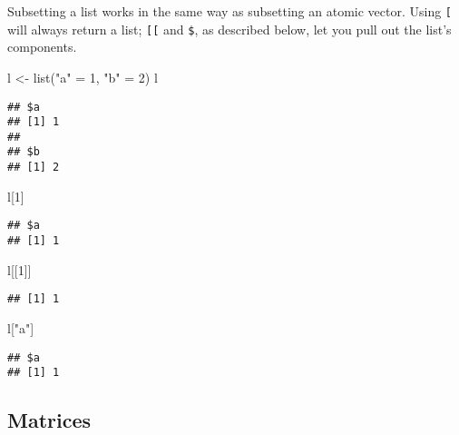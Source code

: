 \documentclass[
]{book}
\newenvironment{Shaded}{\begin{snugshade}}{\end{snugshade}}
\newcommand{\DecValTok}[1]{\textcolor[rgb]{0.00,0.00,0.81}{#1}}
\newcommand{\FunctionTok}[1]{\textcolor[rgb]{0.00,0.00,0.00}{#1}}
\newcommand{\NormalTok}[1]{#1}
\newcommand{\OtherTok}[1]{\textcolor[rgb]{0.56,0.35,0.01}{#1}}
\newcommand{\StringTok}[1]{\textcolor[rgb]{0.31,0.60,0.02}{#1}}
\begin{document}
Subsetting a list works in the same way as subsetting an atomic vector. Using \texttt{{[}} will always return a list; \texttt{{[}{[}} and \texttt{\$}, as described below, let you pull out the list's components.

\begin{Shaded}
\begin{Highlighting}[]
\NormalTok{l }\OtherTok{\textless{}{-}} \FunctionTok{list}\NormalTok{(}\StringTok{"a"} \OtherTok{=} \DecValTok{1}\NormalTok{, }\StringTok{"b"} \OtherTok{=} \DecValTok{2}\NormalTok{)}
\NormalTok{l}
\end{Highlighting}
\end{Shaded}

\begin{verbatim}
## $a
## [1] 1
## 
## $b
## [1] 2
\end{verbatim}

\begin{Shaded}
\begin{Highlighting}[]
\NormalTok{l[}\DecValTok{1}\NormalTok{]}
\end{Highlighting}
\end{Shaded}

\begin{verbatim}
## $a
## [1] 1
\end{verbatim}

\begin{Shaded}
\begin{Highlighting}[]
\NormalTok{l[[}\DecValTok{1}\NormalTok{]]}
\end{Highlighting}
\end{Shaded}

\begin{verbatim}
## [1] 1
\end{verbatim}

\begin{Shaded}
\begin{Highlighting}[]
\NormalTok{l[}\StringTok{"a"}\NormalTok{]}
\end{Highlighting}
\end{Shaded}

\begin{verbatim}
## $a
## [1] 1
\end{verbatim}

\hypertarget{matrices-1}{%
\subsection{Matrices}\label{matrices-1}}
\end{document}
